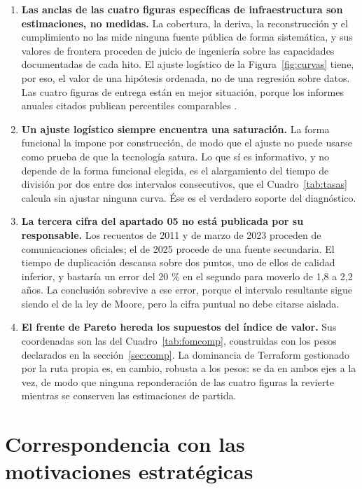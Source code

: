 \documentclass[11pt,letterpaper]{article}
\begin{document}
\begin{enumerate}
  \item \textbf{Las anclas de las cuatro figuras específicas de
    infraestructura son estimaciones, no medidas.} La cobertura, la deriva, la
    reconstrucción y el cumplimiento no las mide ninguna fuente pública de
    forma sistemática, y sus valores de frontera proceden de juicio de
    ingeniería sobre las capacidades documentadas de cada hito. El ajuste
    logístico de la Figura~\ref{fig:curvas} tiene, por eso, el valor de una
    hipótesis ordenada, no de una regresión sobre datos. Las cuatro figuras de
    entrega están en mejor situación, porque los informes anuales citados
    publican percentiles comparables \parencite{forsgren2018,dora2024}.
  \item \textbf{Un ajuste logístico siempre encuentra una saturación.} La
    forma funcional la impone por construcción, de modo que el ajuste no puede
    usarse como prueba de que la tecnología satura. Lo que sí es informativo,
    y no depende de la forma funcional elegida, es el alargamiento del tiempo
    de división por dos entre dos intervalos consecutivos, que el
    Cuadro~\ref{tab:tasas} calcula sin ajustar ninguna curva. Ése es el
    verdadero soporte del diagnóstico.
  \item \textbf{La tercera cifra del apartado 05 no está publicada por su
    responsable.} Los recuentos de 2011 y de marzo de 2023 proceden de
    comunicaciones oficiales; el de 2025 procede de una fuente secundaria. El
    tiempo de duplicación descansa sobre dos puntos, uno de ellos de calidad
    inferior, y bastaría un error del 20 \% en el segundo para moverlo de 1,8
    a 2,2 años. La conclusión sobrevive a ese error, porque el intervalo
    resultante sigue siendo el de la ley de Moore, pero la cifra puntual no
    debe citarse aislada.
  \item \textbf{El frente de Pareto hereda los supuestos del índice de
    valor.} Sus coordenadas son las del Cuadro~\ref{tab:fomcomp}, construidas
    con los pesos declarados en la sección~\ref{sec:comp}. La dominancia de
    Terraform gestionado por la ruta propia es, en cambio, robusta a los
    pesos: se da en ambos ejes a la vez, de modo que ninguna reponderación de
    las cuatro figuras la revierte mientras se conserven las estimaciones de
    partida.
\end{enumerate}


\section{Correspondencia con las motivaciones estratégicas}
\label{sec:motiv}
\end{document}
